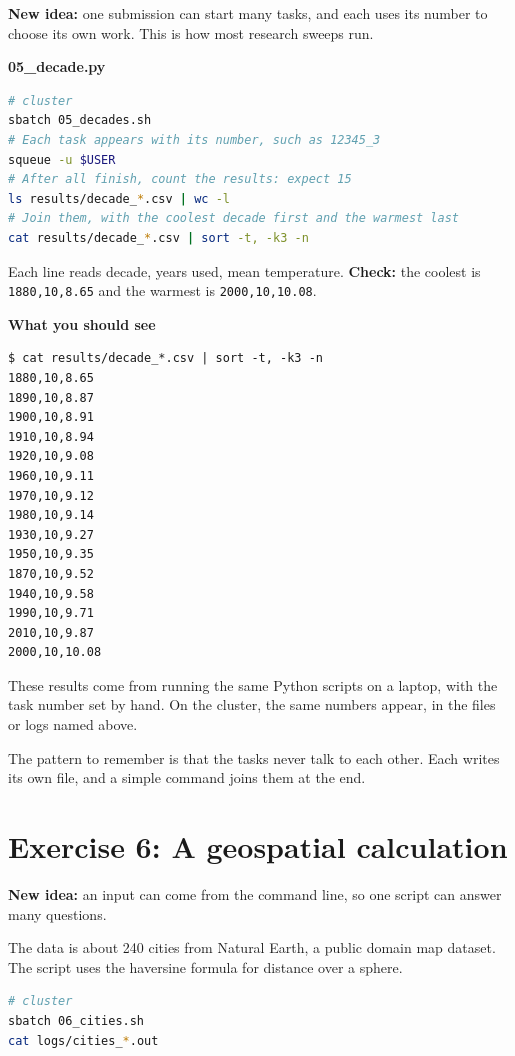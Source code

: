 \textbf{New idea:} one submission can start many tasks, and each uses its number to choose its own work. This is how most research sweeps run.

\textbf{05\_decade.py}



\begin{lstlisting}[language=bash]
# cluster
sbatch 05_decades.sh
# Each task appears with its number, such as 12345_3
squeue -u $USER
# After all finish, count the results: expect 15
ls results/decade_*.csv | wc -l
# Join them, with the coolest decade first and the warmest last
cat results/decade_*.csv | sort -t, -k3 -n
\end{lstlisting}

Each line reads decade, years used, mean temperature. \textbf{Check:} the coolest is \texttt{1880,10,8.65} and the warmest is \texttt{2000,10,10.08}.

\textbf{What you should see}

\begin{lstlisting}[language=text]
$ cat results/decade_*.csv | sort -t, -k3 -n
1880,10,8.65
1890,10,8.87
1900,10,8.91
1910,10,8.94
1920,10,9.08
1960,10,9.11
1970,10,9.12
1980,10,9.14
1930,10,9.27
1950,10,9.35
1870,10,9.52
1940,10,9.58
1990,10,9.71
2010,10,9.87
2000,10,10.08
\end{lstlisting}

These results come from running the same Python scripts on a laptop, with the task number set by hand. On the cluster, the same numbers appear, in the files or logs named above.

The pattern to remember is that the tasks never talk to each other. Each writes its own file, and a simple command joins them at the end.

\section{Exercise 6: A geospatial calculation}\label{exercise-6-a-geospatial-calculation}

\textbf{New idea:} an input can come from the command line, so one script can answer many questions.

The data is about 240 cities from Natural Earth, a public domain map dataset. The script uses the haversine formula for distance over a sphere.

\begin{lstlisting}[language=bash]
# cluster
sbatch 06_cities.sh
cat logs/cities_*.out
\end{lstlisting}

